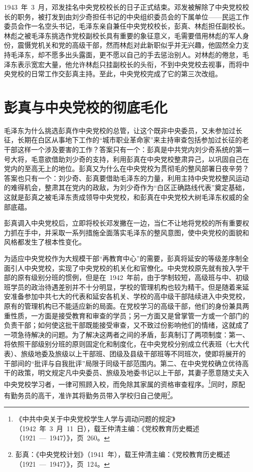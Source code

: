 1943~年~3~月，邓发挂名中央党校校长的日子正式结束。邓发被解除了中央党校校长的职务，被打发到由刘少奇担任书记的中央组织委员会的下属单位——民运工作委员会作一名空头书记，毛泽东亲自兼任中央党校校长，彭真、林彪担任副校长。林彪之被毛泽东挑选作党校副校长具有重要的象征意义，毛需要借用林彪的军人身份，震慑党机关和党的高级干部，然而林彪对此新职似乎并无兴趣，他固然全力支持毛泽东，却不愿多出头露面，更不愿以自己的手去惩治别人。对林彪的倦怠，毛泽东表示宽宏大量，他允许林彪只挂副校长的头衔，不到中央党校去视事，而将中央党校的日常工作交彭真主持。至此，中央党校完成了它的第三次改组。

\section{彭真与中央党校的彻底毛化}

毛泽东为什么挑选彭真作中央党校的总管，让这个既非中央委员，又未参加过长征，长期在白区从事地下工作的“城市职业革命家”来主持审查包括参加过长征的老干部这样一个涉及要害的工作？答案只有一个：彭真是中共党内刘少奇系统的第一号大将，毛意欲借助刘少奇的支持，利用彭真在中央党校整肃异己，以巩固自己在党内的至高无上的地位。彭真又为什么在中央党校为贯彻毛的整风部署日夜辛劳？答案也只有一个：刘少奇、彭真要借助毛泽东的力量，利用主持中央党校整风运动的难得机会，整肃其在党内的政敌，为刘少奇作为“白区正确路线代表”奠定基础，这就是彭真之被毛泽东责成领导中央党校，和彭真在中央党校大树毛泽东权威的全部底蕴。

彭真调入中央党校后，立即将校长邓发撇在一边，当仁不让地将党校的所有重要权力抓在手中，并采取一系列措施全面落实毛泽东的整风意图，使中央党校的面貌和风格都发生了根本性变化。

为适应中央党校作为大规模干部“再教育中心”的需要，彭真将延安的等级差序制全面引人中央党校，实现了中央党校的机关化和官僚化。中央党校原先就有按入学干部的原有级别分班的惯例，但是在~1942~年前，由于学制较短，高级班与中、初级班学员的政治待遇差别并不十分明显，学校的管理机构也较为精干。但是随着来延安准备参加中共七大的代表和延安各机关、学校的高中级干部陆续进入中央党校，原有的管理机构已不能适应新的局面。在党校学习的高级干部，他们的身份兼具两重性质，一方面是接受教育和审查的学员；另一方面又是曾掌管一方或一个部门的负责干部；如何使这批干部既能接受审查，又不致过份影响他们的情绪，这就成了一项急待解决的问题。为了解决这两者之间的矛盾，彭真制订了两项制度：第一、将依照干部级别分班的原则固定化和制度化，在中央党校分别成立代表班（七大代表）、旅级地委及旅级以上干部班、团级及县级干部班等不同班次，使即将展开的干部间的“批评与自我批评”局限于同级干部范围内。第二、在中央党校确立优待高干的政策，明文规定凡中央委员、旅级及地委书记以上干部，其妻子愿意随丈夫入中央党校学习者，一律可照顾入校，而免除其家属的资格审查程序。\footnote{《中共中央关于中央党校学生人学与调动问题的规定》（1942~年~3~月~11~日），载王仲清主编：《党校教育历史概述（1921~—~1947）》，页~260。}同时，原配有勤务员的高干，准许其将勤务员带入学校归自己使用\footnote{彭真：《中央党校计划》（1941~年），载王仲清主编：《党校教育历史概述（1921~—~1947）》，页~124。}。

